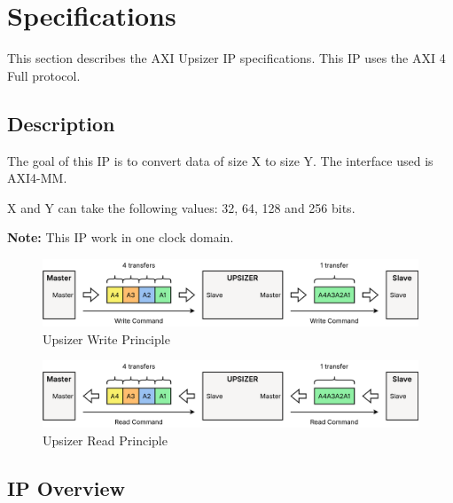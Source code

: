 \newpage
\section{Specifications}

This section describes the AXI Upsizer IP specifications. This IP uses the AXI 4 Full protocol.

\subsection{Description}

The goal of this IP is to convert data of size X to size Y. The 
interface used is AXI4-MM.

X and Y can take the following values: 32, 64, 128 and 256 bits. 
 
\textbf{Note:} This IP work in one clock domain. 

\begin{figure}[H]
    \centering
    \includegraphics[width=1\linewidth]{images/UPSIZER_PRINCIPLE_WRITE.png}
    \caption{Upsizer Write Principle}
\end{figure}

\begin{figure}[H]
    \centering
    \includegraphics[width=1\linewidth]{images/UPSIZER_PRINCIPLE_READ.png}
    \caption{Upsizer Read Principle}
\end{figure}

\subsection{IP Overview}

